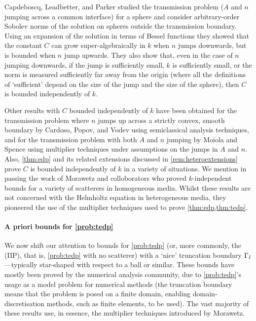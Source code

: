 Capdeboscq, Leadbetter, and Parker \cite{Ca:12,CaLePa:12} studied the transmission problem ($A$ and $n$ jumping across a common interface) for a sphere and consider arbitrary-order Sobolev norms of the solution on spheres outside the transmission boundary. Using an expansion of the solution in terms of Bessel functions they showed that the constant $C$ can grow super-algebraically in $k$ when $n$ jumps downwards, but is bounded when $n$ jump upwards. They also show that, even in the case of $n$ jumping downwards, if the jump is sufficiently small, $k$ is sufficiently small, or the norm is measured sufficiently far away from the origin (where all the definitions of `sufficient' depend on the size of the jump and the size of the sphere), then $C$ is bounded independently of $k.$

Other results with $C$ bounded independently of $k$ have been obtained for the transmission problem where $n$ jumps up across a strictly convex, smooth boundary by Cardoso, Popov, and Vodev \cite{CaPoVo:99,PoVo:99b} using semiclassical analysis techniques, and for the transmission problem with both $A$ and $n$ jumping by Moiola and Spence \cite{MoSp:19} using multiplier techniques under assumptions on the jumps in $A$ and $n.$ Also, \cref{thm:edp} and its related extensions discussed in \cref{rem:heteroextensions} prove $C$ is bounded independently of $k$ in a variety of situations. We mention in passing the work of Morawetz and colloborators \cite{Mo:61,MoLu:68,Mo:75,MoRaSt:77} who proved $k$-independent bounds for a variety of scatterers in homogeneous media. Whilst these results are not concerned with the Helmholtz equation in heterogeneous media, they pioneered the use of the multiplier techniques used to prove \cref{thm:edp,thm:tedp}.

\paragraph{A priori bounds for \cref{prob:tedp}} We now shift our attention to bounds for \cref{prob:tedp} (or, more commonly, the  (IIP), that is, \cref{prob:tedp} with no scatterer) with a `nice' truncation boundary $\Gamma_{I}$---typically star-shaped with respect to a ball or similar. These bounds have mostly been proved by the numerical analysis community, due to \cref{prob:tedp}'s usage as a model problem for numerical methods (the truncation boundary means that the problem is posed on a finite domain, enabling domain-discretisation methods, such as finite elements, to be used). The vast majority of these results use, in essence, the multiplier techniques introduced by Morawetz.

